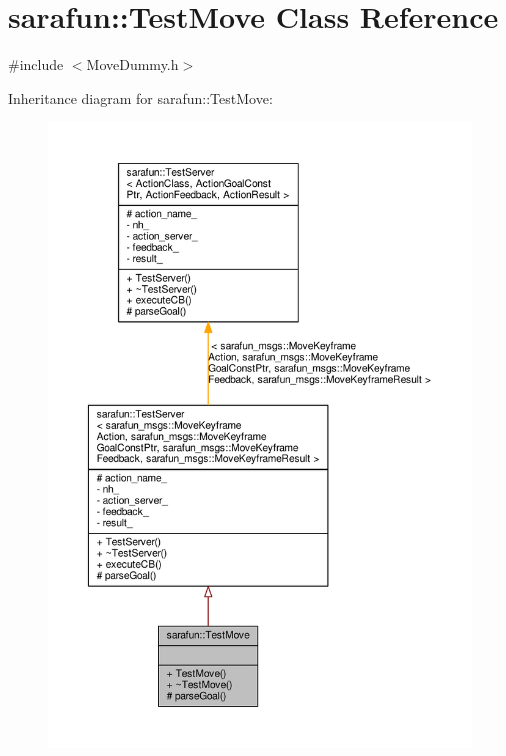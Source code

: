 \hypertarget{classsarafun_1_1TestMove}{\section{sarafun\-:\-:Test\-Move Class Reference}
\label{classsarafun_1_1TestMove}
}


{\ttfamily \#include $<$Move\-Dummy.\-h$>$}



Inheritance diagram for sarafun\-:\-:Test\-Move\-:
\nopagebreak
\begin{figure}[H]
\begin{center}
\leavevmode
\includegraphics[width=350pt]{d2/d4d/classsarafun_1_1TestMove__inherit__graph}
\end{center}
\end{figure}


